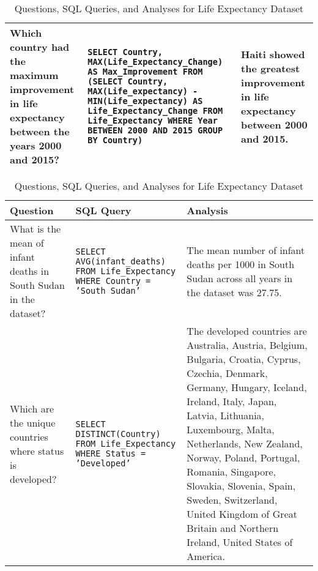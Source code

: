 \documentclass[11pt]{article}
\begin{document}
\begin{table*}[t]
\begin{tabular}{|p{}|p{}|p{}|}
Which country had the maximum improvement in life expectancy between the years 2000 and 2015? & 
\texttt{SELECT Country, MAX(Life\_Expectancy\_Change) AS Max\_Improvement FROM (SELECT Country, MAX(Life\_expectancy) - MIN(Life\_expectancy) AS Life\_Expectancy\_Change FROM Life\_Expectancy WHERE Year BETWEEN 2000 AND 2015 GROUP BY Country)} & 
Haiti showed the greatest improvement in life expectancy between 2000 and 2015. \\ \hline

\end{tabular}
\caption{Questions, SQL Queries, and Analyses for Life Expectancy Dataset}
\label{tab:questions_sql_analysis - Part 1}
\label{append:5}
\end{table*}

\begin{table*}[t]
\centering
\begin{tabular}{|p{}|p{}|p{}|}
\hline
\textbf{Question} & \textbf{SQL Query} & \textbf{Analysis} \\ \hline

What is the mean of infant deaths in South Sudan in the dataset? & 
\texttt{SELECT AVG(infant\_deaths) FROM Life\_Expectancy WHERE Country = 'South Sudan'} & 
The mean number of infant deaths per 1000 in South Sudan across all years in the dataset was 27.75. \\ \hline

Which are the unique countries where status is developed? & 
\texttt{SELECT DISTINCT(Country) FROM Life\_Expectancy WHERE Status = 'Developed'} & 
The developed countries are Australia, Austria, Belgium, Bulgaria, Croatia, Cyprus, Czechia, Denmark, Germany, Hungary, Iceland, Ireland, Italy, Japan, Latvia, Lithuania, Luxembourg, Malta, Netherlands, New Zealand, Norway, Poland, Portugal, Romania, Singapore, Slovakia, Slovenia, Spain, Sweden, Switzerland, United Kingdom of Great Britain and Northern Ireland, United States of America. \\ \hline

\end{tabular}
\caption{Questions, SQL Queries, and Analyses for Life Expectancy Dataset}
\label{tab:questions_sql_analysis - Part 2}
\label{append:6}
\end{table*}
\end{document}
